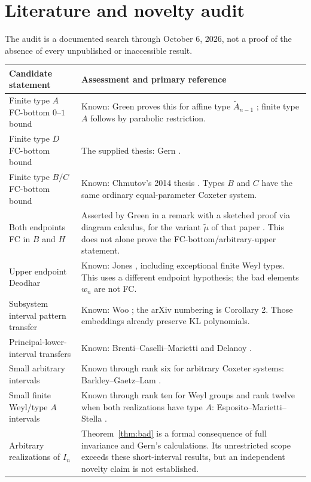 \documentclass[11pt]{article}
\theoremstyle{definition}\newtheorem{definition}[theorem]{Definition}
\theoremstyle{remark}\newtheorem{remark}[theorem]{Remark}
\begin{document}
\section{Literature and novelty audit}
The audit is a documented search through October 6, 2026, not a proof
of the absence of every unpublished or inaccessible result.
\begin{center}
\small
\begin{tabular}{p{}p{}}
\toprule
Candidate statement&Assessment and primary reference\\
\midrule
Finite type $A$ FC-bottom $0$--$1$ bound&Known: Green proves this for
affine type $\widetilde A_{n-1}$ \cite[Theorem 4.1; arXiv Theorem 3.1]{green};
finite type $A$ follows by parabolic restriction.\\
Finite type $D$ FC-bottom bound&The supplied thesis:
Gern \cite[Theorem 4.5.11]{gern}.\\
Finite type $B/C$ FC-bottom bound&Known: Chmutov's 2014 thesis
\cite[Theorem 2.3.8]{chmutov}. Types $B$ and $C$ have the same
ordinary equal-parameter Coxeter system.\\
Both endpoints FC in $B$ and $H$&Asserted by Green in a remark with a
sketched proof via diagram calculus, for the variant $\tilde\mu$ of that paper
\cite[Remark 7.13]{jonestraces}. This does not alone prove the
FC-bottom/arbitrary-upper statement.\\
Upper endpoint Deodhar&Known: Jones \cite[Theorem 1.2]{jones},
including exceptional finite Weyl types. This uses a different
endpoint hypothesis; the bad elements $w_n$ are not FC.\\
Subsystem interval pattern transfer&Known: Woo
\cite[Corollary 3.3]{woo}; the arXiv numbering is Corollary 2.
Those embeddings already preserve KL polynomials.\\
Principal-lower-interval transfers&Known: Brenti--Caselli--Marietti
\cite[Theorem 7.8 and Corollary 8.4]{bcm} and Delanoy \cite{delanoy}.\\
Small arbitrary intervals&Known through rank six for arbitrary
Coxeter systems: Barkley--Gaetz--Lam \cite[Corollary 1.4]{bgl}.\\
Small finite Weyl/type $A$ intervals&Known through rank ten for Weyl
groups and rank twelve when both realizations have type $A$:
Esposito--Marietti--Stella
\cite[Corollary 1.3(ii)]{ems}.\\
Arbitrary realizations of $I_n$&Theorem~\ref{thm:bad} is a formal
consequence of full invariance and Gern's calculations.
Its unrestricted scope exceeds these short-interval results,
but an independent novelty claim is not established.\\
\bottomrule
\end{tabular}
\end{center}
\end{document}

